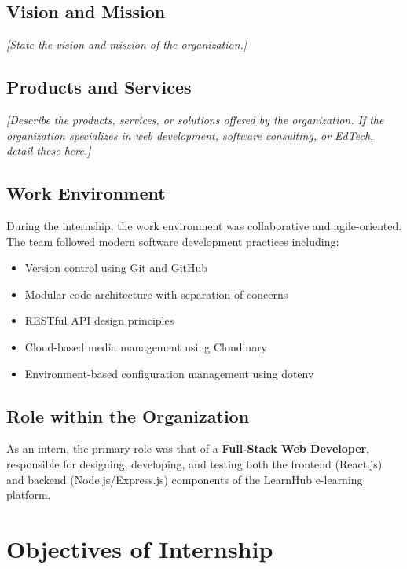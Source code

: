 \documentclass[12pt,a4paper]{report}
\begin{document}
\section{Vision and Mission}
\textit{[State the vision and mission of the organization.]}

\section{Products and Services}
\textit{[Describe the products, services, or solutions offered by the organization. If the organization specializes in web development, software consulting, or EdTech, detail these here.]}

\section{Work Environment}
During the internship, the work environment was collaborative and agile-oriented. The team followed modern software development practices including:
\begin{itemize}
    \item Version control using Git and GitHub
    \item Modular code architecture with separation of concerns
    \item RESTful API design principles
    \item Cloud-based media management using Cloudinary
    \item Environment-based configuration management using dotenv
\end{itemize}

\section{Role within the Organization}
As an intern, the primary role was that of a \textbf{Full-Stack Web Developer}, responsible for designing, developing, and testing both the frontend (React.js) and backend (Node.js/Express.js) components of the LearnHub e-learning platform.


\chapter{Objectives of Internship}
\end{document}

